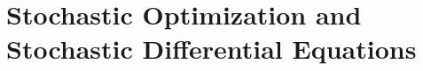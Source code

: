 \documentclass[../main]{subfiles}
\begin{document}
\chapter{Stochastic Optimization and Stochastic Differential Equations}
\end{document}
